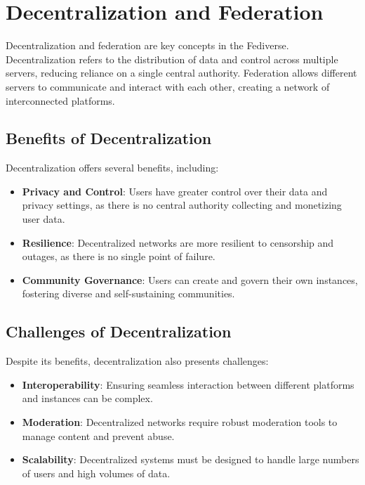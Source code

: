 \section{Decentralization and Federation}

Decentralization and federation are key concepts in the Fediverse. Decentralization refers to the distribution of data and control across multiple servers, reducing reliance on a single central authority. Federation allows different servers to communicate and interact with each other, creating a network of interconnected platforms.

\subsection{Benefits of Decentralization}

Decentralization offers several benefits, including:

\begin{itemize}
  \item \textbf{Privacy and Control}: Users have greater control over their data and privacy settings, as there is no central authority collecting and monetizing user data.
  \item \textbf{Resilience}: Decentralized networks are more resilient to censorship and outages, as there is no single point of failure.
  \item \textbf{Community Governance}: Users can create and govern their own instances, fostering diverse and self-sustaining communities.
\end{itemize}

\subsection{Challenges of Decentralization}

Despite its benefits, decentralization also presents challenges:

\begin{itemize}
  \item \textbf{Interoperability}: Ensuring seamless interaction between different platforms and instances can be complex.
  \item \textbf{Moderation}: Decentralized networks require robust moderation tools to manage content and prevent abuse.
  \item \textbf{Scalability}: Decentralized systems must be designed to handle large numbers of users and high volumes of data.
\end{itemize}

